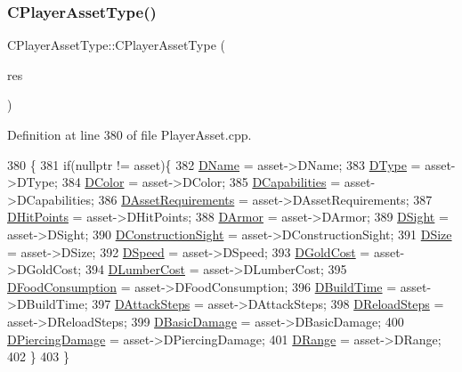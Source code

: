 \subsubsection{\texorpdfstring{C\+Player\+Asset\+Type()}{CPlayerAssetType()}\hspace{0.1cm}{\footnotesize\ttfamily [2/2]}}
{\footnotesize\ttfamily C\+Player\+Asset\+Type\+::\+C\+Player\+Asset\+Type (\begin{DoxyParamCaption}\item[{std\+::shared\+\_\+ptr$<$ \hyperlink{classCPlayerAssetType}{C\+Player\+Asset\+Type} $>$}]{res }\end{DoxyParamCaption})}



Definition at line 380 of file Player\+Asset.\+cpp.


\begin{DoxyCode}
380                                                                          \{
381     \textcolor{keywordflow}{if}(\textcolor{keyword}{nullptr} != asset)\{
382         \hyperlink{classCPlayerAssetType_a95b557ce33af1aaecb26e8d78b0e2706}{DName} = asset->DName;
383         \hyperlink{classCPlayerAssetType_a2a52bda918a79ecf5582314ef1f61c8a}{DType} = asset->DType;
384         \hyperlink{classCPlayerAssetType_abd32b27281bcf17a611802aef148462b}{DColor} = asset->DColor;
385         \hyperlink{classCPlayerAssetType_a243f9161c56446b378dc42b51977fc58}{DCapabilities} = asset->DCapabilities;
386         \hyperlink{classCPlayerAssetType_a76d89bd6479ac30a0452d0a8aaf731c5}{DAssetRequirements} = asset->DAssetRequirements;
387         \hyperlink{classCPlayerAssetType_a0f10bff263838914bf347d9e9bf0af68}{DHitPoints} = asset->DHitPoints;
388         \hyperlink{classCPlayerAssetType_ac211254f807a497099509a3e96f7185a}{DArmor} = asset->DArmor;
389         \hyperlink{classCPlayerAssetType_afa32c3f45737443299a4e681dfe64911}{DSight} = asset->DSight;
390         \hyperlink{classCPlayerAssetType_a71b34081d4540087472af3cb9052e04a}{DConstructionSight} = asset->DConstructionSight;
391         \hyperlink{classCPlayerAssetType_a00e59fe19f83fe37f23341c05010dbc2}{DSize} = asset->DSize;
392         \hyperlink{classCPlayerAssetType_a0e72be67119e97fb64a6036cd5da8d1a}{DSpeed} = asset->DSpeed;
393         \hyperlink{classCPlayerAssetType_a2153f3ed158144fc517efd2866de0017}{DGoldCost} = asset->DGoldCost;
394         \hyperlink{classCPlayerAssetType_aab2aeb930d654fd5eab51be157b3439f}{DLumberCost} = asset->DLumberCost;
395         \hyperlink{classCPlayerAssetType_a8fcab35c2b576476b6f2c80c8b8762fb}{DFoodConsumption} = asset->DFoodConsumption;
396         \hyperlink{classCPlayerAssetType_aa65de0691276352ebc3c3a9936a74278}{DBuildTime} = asset->DBuildTime;
397         \hyperlink{classCPlayerAssetType_af2a95fbee4ed2ac1ff1da0f649966a6d}{DAttackSteps} = asset->DAttackSteps;
398         \hyperlink{classCPlayerAssetType_a192d6ac421608663d18d1a0cda00841e}{DReloadSteps} = asset->DReloadSteps;
399         \hyperlink{classCPlayerAssetType_ade46bb31e24e01ba4b523bdf67472d59}{DBasicDamage} = asset->DBasicDamage;
400         \hyperlink{classCPlayerAssetType_af7303175365306fb69e5ff9170b72234}{DPiercingDamage} = asset->DPiercingDamage;
401         \hyperlink{classCPlayerAssetType_a1204a9470d8940fdb81a63670a0f6779}{DRange} = asset->DRange;
402     \}
403 \}
\end{DoxyCode}

